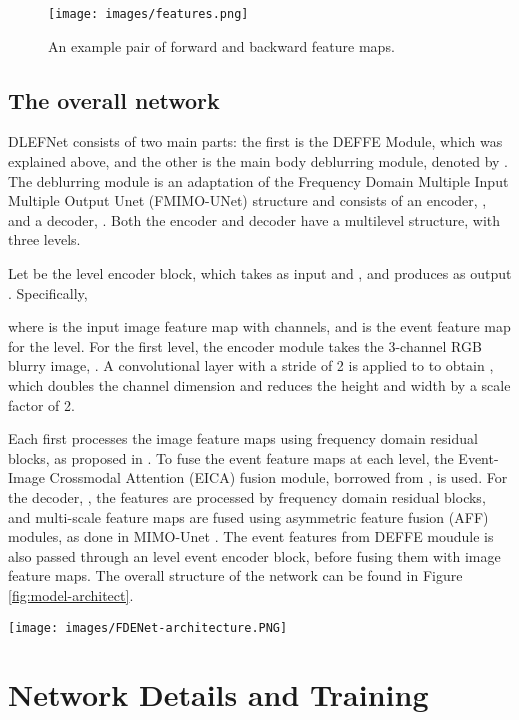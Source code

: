 \documentclass{article}
\begin{document}
\begin{figure}[ht]
\centering
\texttt{[image: images/features.png]}
\caption{An example pair of forward and backward feature maps.}
\label{fig:resultsReblur}
\end{figure}

\subsection{The overall network}
DLEFNet consists of two main parts: the first is the DEFFE Module, which was explained above, and the other is the main body deblurring module, denoted by . The deblurring module is an adaptation of the Frequency Domain Multiple Input Multiple Output Unet (FMIMO-UNet) structure and consists of an encoder, , and a decoder, . Both the encoder and decoder have a multilevel structure, with three levels.

Let  be the  level encoder block, which takes as input  and , and produces as output . Specifically,

where  is the input image feature map with  channels, and  is the event feature map for the  level. 
For the first level, the encoder module takes the 3-channel RGB blurry image, . 
A convolutional layer with a stride of 2 is applied to  to obtain , which doubles the channel dimension and 
reduces the height and width by a scale factor of 2. 

Each  first processes the image feature maps using frequency domain residual blocks, 
as proposed in \cite{DeepRFT}. 
To fuse the event feature maps at each level, the Event-Image Crossmodal Attention (EICA) fusion module, 
borrowed from \cite{EFNet}, is used. For the decoder, , the features are processed by 
frequency domain residual blocks, and multi-scale feature maps are fused using asymmetric feature 
fusion (AFF) modules, as done in MIMO-Unet \cite{MIMO}. The event features from DEFFE moudule is also passed through an  level event encoder block, 
 before fusing them with image feature maps. The overall structure of the network can be 
found in Figure \ref{fig:model-architect}.

\begin{figure*}[ht]
\centering
\texttt{[image: images/FDENet-architecture.PNG]}
\caption{The pipeline of the proposed DLEFNet}
\label{fig:model-architect}
\end{figure*}


\section{Network Details and Training}
\end{document}
